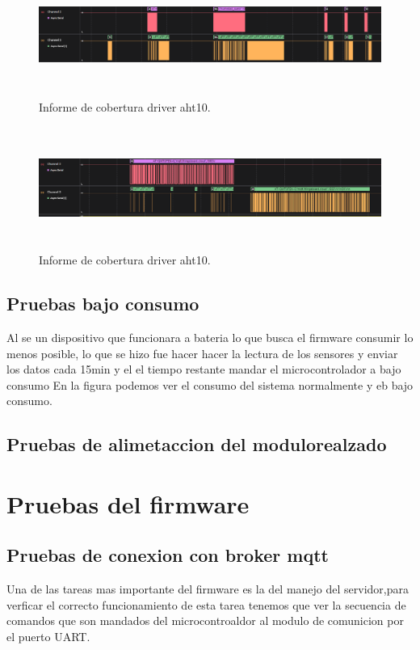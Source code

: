 \begin{figure}[h!]
  \centering
    \includegraphics[width=\linewidth, height=4cm]{./Figures/trama_uart4.png}
  \caption{Informe de cobertura driver aht10.}
    \label{fig:trama uart}
\end{figure}

\begin{figure}[h!]
  \centering
    \includegraphics[width=\linewidth, height=4cm]{./Figures/trama_uart1.png}
  \caption{Informe de cobertura driver aht10.}
    \label{fig:trama uart1}
\end{figure}

\subsection{Pruebas bajo consumo }
Al se un dispositivo que funcionara a bateria lo que busca el firmware consumir lo menos posible, lo que se hizo fue hacer hacer la lectura de los sensores y enviar los datos cada 15min y el el tiempo restante mandar el microcontrolador a bajo consumo 
En la figura podemos ver el consumo del sistema normalmente y eb bajo consumo.


\subsection{Pruebas de alimetaccion del modulorealzado}

\clearpage 
\section{Pruebas del firmware}
\subsection{Pruebas de conexion con broker mqtt}
Una de las tareas mas importante del firmware es la del manejo del servidor,para verficar el correcto funcionamiento de esta tarea tenemos que ver la secuencia de comandos que son mandados del microcontroaldor al modulo de comunicion por el puerto UART.

